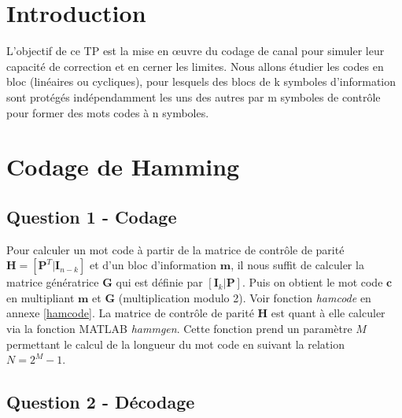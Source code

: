 \documentclass[a4paper, 12pt]{article}
\begin{document}






\clearpage

\section{Introduction}

L’objectif de ce TP est la mise en œuvre du codage de canal pour simuler leur capacité de correction et en cerner les limites. Nous allons étudier les codes en bloc (linéaires ou cycliques), pour lesquels des blocs de k symboles d’information sont protégés indépendamment les uns des autres par m symboles de contrôle pour former des mots codes à n symboles.\\


\section{Codage de Hamming}

\subsection{Question 1 - Codage}

Pour calculer un mot code à partir de la matrice de contrôle de parité $\mathbf{H} = [\mathbf{P}^T | \mathbf{I}_{n-k}]$ et d'un bloc d'information $\mathbf{m}$, il nous suffit de calculer la matrice génératrice $\mathbf{G}$ qui est définie par $[\mathbf{I}_k | \mathbf{P}]$. Puis on obtient le mot code $\mathbf{c}$ en multipliant $\mathbf{m}$ et $\mathbf{G}$ (multiplication modulo 2). Voir fonction \textit{hamcode} en annexe \ref{hamcode}. La matrice de contrôle de parité $\mathbf{H}$ est quant à elle calculer via la fonction MATLAB \textit{hammgen}. Cette fonction prend un paramètre $M$ permettant le calcul de la longueur du mot code en suivant la relation $N=2^M-1$. \\

\subsection{Question 2 - Décodage}
\end{document}
